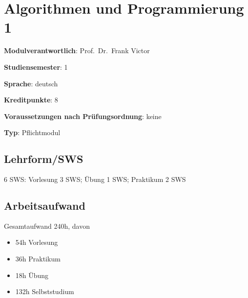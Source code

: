 \chapter{Algorithmen und Programmierung
1\label{/mi-2017/modulbeschreibungen-bachelor/BA_AlgorithmenundProgrammierung1}}\label{algorithmen-und-programmierung-1pathlabelmi-2017modulbeschreibungen-bachelorbaux5falgorithmenundprogrammierung1}

\begin{modulHead}
\textbf{Modulverantwortlich}: Prof.~Dr.~Frank
Victor
\end{modulHead}
\begin{modulHead}
\textbf{Studiensemester}:
1
\end{modulHead}
\begin{modulHead}
\textbf{Sprache}:
deutsch
\end{modulHead}
\begin{modulHead}
\textbf{Kreditpunkte}:
8
\end{modulHead}
\begin{modulHead}
\textbf{Voraussetzungen nach
Prüfungsordnung}: keine
\end{modulHead}
\begin{modulHead}
\textbf{Typ}:
Pflichtmodul
\end{modulHead}


\section*{Lehrform/SWS\label{/mi-2017/modulbeschreibungen-bachelor/BA_AlgorithmenundProgrammierung1}}\label{lehrformswspathlabelmi-2017modulbeschreibungen-bachelorbaux5falgorithmenundprogrammierung1}

6 SWS: Vorlesung 3 SWS; Übung 1 SWS; Praktikum 2 SWS

\section*{Arbeitsaufwand\label{/mi-2017/modulbeschreibungen-bachelor/BA_AlgorithmenundProgrammierung1}}\label{arbeitsaufwandpathlabelmi-2017modulbeschreibungen-bachelorbaux5falgorithmenundprogrammierung1}

Gesamtaufwand 240h, davon

\begin{itemize}
\tightlist
\item
  54h Vorlesung
\item
  36h Praktikum
\item
  18h Übung
\item
  132h Selbststudium
\end{itemize}

